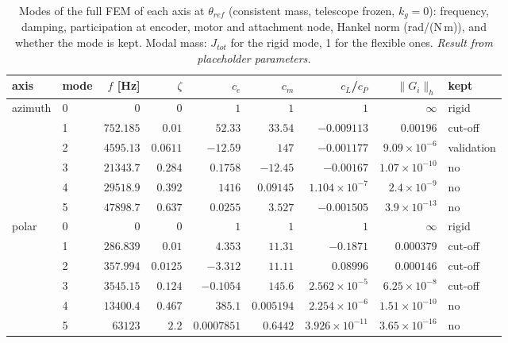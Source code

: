 \documentclass[10pt,a4paper]{article}
\numberwithin{equation}{section}
\begin{document}
\begin{table}[H]\centering\small
\caption{Modes of the full FEM of each axis at $\theta_{ref}$ (consistent mass, telescope frozen, $k_g = 0$): frequency, damping, participation at encoder, motor and attachment node, Hankel norm (rad/(N\,m)), and whether the mode is kept. Modal mass: $J_{tot}$ for the rigid mode, 1 for the flexible ones. \emph{Result from placeholder parameters.}}\label{tab:modal_modes}
\begin{tabular}{llrrrrrrl}\toprule
axis & mode & $f$ [Hz] & $\zeta$ & $c_e$ & $c_m$ & $c_{L}$/$c_P$ & $\|G_i\|_h$ & kept \\ \midrule
azimuth & 0 & $0$ & $0$ & $1$ & $1$ & $1$ & $\infty$ & rigid \\
 & 1 & $752.185$ & $0.01$ & $52.33$ & $33.54$ & $-0.009113$ & $0.00196$ & cut-off \\
 & 2 & $4595.13$ & $0.0611$ & $-12.59$ & $147$ & $-0.001177$ & $9.09\times10^{-6}$ & validation \\
 & 3 & $21343.7$ & $0.284$ & $0.1758$ & $-12.45$ & $-0.00167$ & $1.07\times10^{-10}$ & no \\
 & 4 & $29518.9$ & $0.392$ & $1416$ & $0.09145$ & $1.104\times10^{-7}$ & $2.4\times10^{-9}$ & no \\
 & 5 & $47898.7$ & $0.637$ & $0.0255$ & $3.527$ & $-0.001505$ & $3.9\times10^{-13}$ & no \\
\midrule
polar & 0 & $0$ & $0$ & $1$ & $1$ & $1$ & $\infty$ & rigid \\
 & 1 & $286.839$ & $0.01$ & $4.353$ & $11.31$ & $-0.1871$ & $0.000379$ & cut-off \\
 & 2 & $357.994$ & $0.0125$ & $-3.312$ & $11.11$ & $0.08996$ & $0.000146$ & cut-off \\
 & 3 & $3545.15$ & $0.124$ & $-0.1054$ & $145.6$ & $2.562\times10^{-5}$ & $6.25\times10^{-8}$ & cut-off \\
 & 4 & $13400.4$ & $0.467$ & $385.1$ & $0.005194$ & $2.254\times10^{-6}$ & $1.51\times10^{-10}$ & no \\
 & 5 & $63123$ & $2.2$ & $0.0007851$ & $0.6442$ & $3.926\times10^{-11}$ & $3.65\times10^{-16}$ & no \\

\bottomrule\end{tabular}\end{table}
\end{document}
